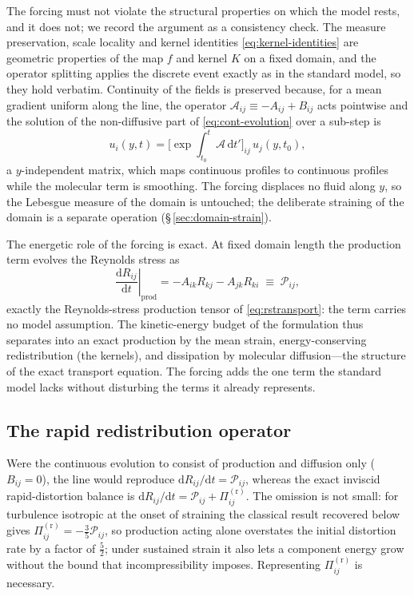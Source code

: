 \documentclass[lineno]{JFM-FLM_Au}
\newcounter{assumption}
\begin{document}
The forcing must not violate the structural properties on which the
model rests, and it does not; we record the argument as a consistency
check. The measure preservation, scale locality and kernel identities
\eqref{eq:kernel-identities} are geometric properties of the map $f$ and
kernel $K$ on a fixed domain, and the operator splitting applies the
discrete event exactly as in the standard model, so they hold verbatim.
Continuity of the fields is preserved because, for a mean gradient
uniform along the line, the operator
$\mathcal{A}_{ij}\equiv-A_{ij}+B_{ij}$ acts pointwise and the solution of
the non-diffusive part of \eqref{eq:cont-evolution} over a sub-step is
\begin{equation}
  u_i(y,t)=\big[\exp\!\textstyle\int_{t_0}^{t}
           \mathcal{A}\,\mathrm{d}t'\big]_{ij}\,u_j(y,t_0),
  \label{eq:matrixexp}
\end{equation}
a $y$-independent matrix, which maps continuous profiles to continuous
profiles while the molecular term is smoothing. The forcing displaces no
fluid along $y$, so the Lebesgue measure of the domain is untouched; the
deliberate straining of the domain is a separate operation
(\S\,\ref{sec:domain-strain}).

The energetic role of the forcing is exact. At fixed domain length the
production term evolves the Reynolds stress as
\begin{equation}
  \left.\frac{\mathrm{d}R_{ij}}{\mathrm{d}t}\right|_{\text{prod}}
  = -A_{ik}R_{kj}-A_{jk}R_{ki}
  \;\equiv\; \mathcal{P}_{ij},
  \label{eq:production-rate}
\end{equation}
exactly the Reynolds-stress production tensor of \eqref{eq:rstransport}:
the term carries no model assumption. The kinetic-energy budget of the
formulation thus separates into an exact production by the mean strain,
energy-conserving redistribution (the kernels), and dissipation by
molecular diffusion---the structure of the exact transport equation. The
forcing adds the one term the standard model lacks without disturbing the
terms it already represents.

\subsection{The rapid redistribution operator}\label{sec:rapid-kernel}

Were the continuous evolution to consist of production and diffusion only
($B_{ij}=0$), the line would reproduce
$\mathrm{d}R_{ij}/\mathrm{d}t=\mathcal{P}_{ij}$, whereas the exact
inviscid rapid-distortion balance is
$\mathrm{d}R_{ij}/\mathrm{d}t=\mathcal{P}_{ij}+\Pi^{(\mathrm r)}_{ij}$.
The omission is not small: for turbulence isotropic at the onset of
straining the classical result recovered below gives
$\Pi^{(\mathrm r)}_{ij}=-\tfrac35\mathcal{P}_{ij}$, so production acting
alone overstates the initial distortion rate by a factor of $\tfrac52$;
under sustained strain it also lets a component energy grow without the
bound that incompressibility imposes. Representing
$\Pi^{(\mathrm r)}_{ij}$ is necessary.
\end{document}
